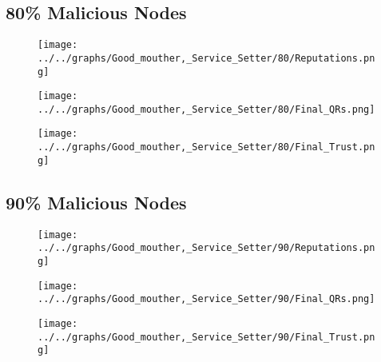 \begin{minipage}[t]{0.49\columnwidth}
\subsection*{80\% Malicious Nodes}
    \begin{figure}[H]
        \centering
        \texttt{[image: ../../graphs/Good\_mouther,\_Service\_Setter/80/Reputations.png]}
    \end{figure}
    \begin{figure}[H]
        \centering
        \texttt{[image: ../../graphs/Good\_mouther,\_Service\_Setter/80/Final\_QRs.png]}
    \end{figure}
\end{minipage}
\begin{minipage}[t]{0.49\columnwidth}
    \begin{figure}[H]
        \centering
        \texttt{[image: ../../graphs/Good\_mouther,\_Service\_Setter/80/Final\_Trust.png]}
    \end{figure}
\end{minipage}

\begin{minipage}[t]{0.49\columnwidth}
\subsection*{90\% Malicious Nodes}
    \begin{figure}[H]
        \centering
        \texttt{[image: ../../graphs/Good\_mouther,\_Service\_Setter/90/Reputations.png]}
    \end{figure}
    \begin{figure}[H]
        \centering
        \texttt{[image: ../../graphs/Good\_mouther,\_Service\_Setter/90/Final\_QRs.png]}
    \end{figure}
\end{minipage}
\begin{minipage}[t]{0.49\columnwidth}
    \begin{figure}[H]
        \centering
        \texttt{[image: ../../graphs/Good\_mouther,\_Service\_Setter/90/Final\_Trust.png]}
    \end{figure}
\end{minipage}
\newpage

